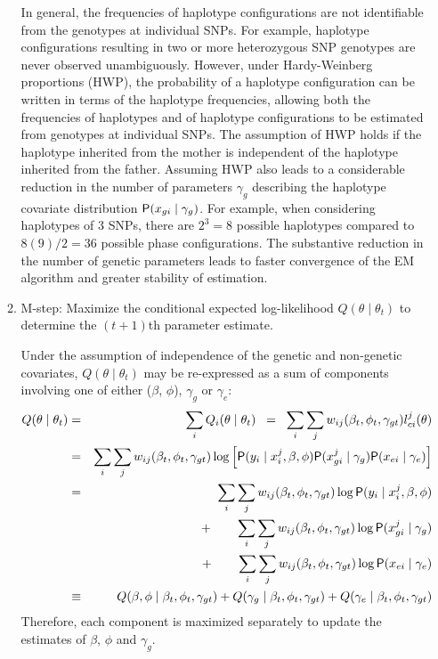 \documentclass[article, shortnames]{jss}
\begin{document}
\begin{enumerate}
\begin{enumerate}
In general, the frequencies of haplotype configurations are not identifiable 
from the genotypes at individual SNPs. For example, haplotype configurations 
resulting in two or more heterozygous SNP genotypes are never observed 
unambiguously. However, under Hardy-Weinberg proportions (HWP), the probability 
of a haplotype configuration can be written in terms of the haplotype frequencies,
allowing both the frequencies of haplotypes and of haplotype configurations to
be estimated from genotypes at individual SNPs. The assumption of HWP holds
if the haplotype inherited from the mother is independent of the haplotype 
inherited from the father. Assuming HWP also leads to a
considerable reduction in the number of parameters $\gamma_g$ 
describing the haplotype covariate distribution $\mathsf{P}(x_{gi} \mid \gamma_g)$. 
For example, when considering haplotypes of 3 SNPs, there are $2^{3}=8$ 
possible haplotypes compared to $8(9)/2=36$ possible phase configurations. 
The substantive reduction in the number of genetic parameters leads to 
faster convergence of the EM algorithm and greater stability of estimation.


\item M-step: Maximize the conditional expected log-likelihood $Q(\theta
\mid \theta_t)$ to determine the \mbox{$(t+1)$th} parameter estimate.

Under the assumption of independence of the genetic and non-genetic
covariates, $Q(\theta \mid \theta_t)$ may be re-expressed as a sum of
components involving one of either ($\beta$, $\phi$), $\gamma_g$ or $\gamma_e$:
\begin{eqnarray*}
Q(\theta \mid \theta_t) & = & \sum_i Q_i(\theta \mid \theta_t) 
  \;\;  = \;\; \sum_i \sum_j w_{ij}(\beta_t,\phi_t,\gamma_{gt})
 l_{ci}^j(\theta) \\
  & = & \sum_i \sum_j 
    w_{ij}(\beta_t,\phi_t,\gamma_{gt})
    \log\left[ \mathsf{P}(y_i \mid x^j_i, \beta, \phi)
      \mathsf{P}(x^j_{gi} \mid \gamma_g) \mathsf{P}(x_{ei} \mid \gamma_e) \right] \\
 & = & \sum_i \sum_j 
    w_{ij}(\beta_t,\phi_t,\gamma_{gt})
         \log \mathsf{P}(y_i \mid x^j_i, \beta, \phi)\\
 & &+\qquad \sum_i \sum_j 
    w_{ij}(\beta_t,\phi_t,\gamma_{gt})
\log \mathsf{P}(x^j_{gi} \mid\gamma_g) \\
& &+\qquad \sum_i \sum_j 
    w_{ij}(\beta_t,\phi_t,\gamma_{gt})
       \log \mathsf{P}(x_{ei} \mid \gamma_e) \\
 & \equiv & Q(\beta , \phi \mid \beta_t, \phi_t, \gamma_{gt})+
      Q(\gamma_g \mid \beta_t, \phi_t, \gamma_{gt})+
     Q(\gamma_e \mid \beta_t, \phi_t, \gamma_{gt})
\end{eqnarray*}
Therefore, each component is maximized separately to update the estimates
of $\beta$, $\phi$ and $\gamma_{g}$.


\end{enumerate}
\end{enumerate}
\end{document}
